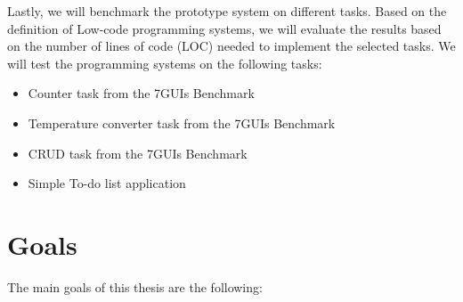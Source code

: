 Lastly, we will benchmark the prototype system on different tasks.
Based on the definition of Low-code programming systems, we will evaluate the results based on the number of lines of code (LOC) needed to implement the selected tasks.
We will test the programming systems on the following tasks:
\begin{itemize}
	\item Counter task from the 7GUIs Benchmark
	\item Temperature converter task from the 7GUIs Benchmark
	\item CRUD task from the 7GUIs Benchmark
	\item Simple To-do list application
\end{itemize}



\newpage
\section*{Goals}
The main goals of this thesis are the following:
